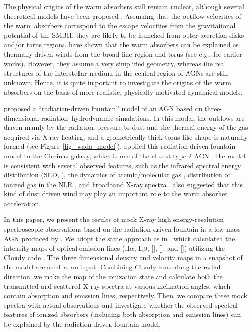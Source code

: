 \documentclass[twocolumn,times,twocolappendix]{aastex63}
\begin{document}
The physical origins of the warm absorbers still remain unclear, although
several theoretical models have been proposed \citep[e.g.,][]{Krolik1995,Proga2000,Fukumura2010}. Assuming
that the outflow velocities of the warm absorbers correspond to the escape
velocities from the gravitational potential of the SMBH, they are
likely to be launched from outer accretion disks and/or torus regions.
\citet{Mizumoto2019} have shown that the warm absorbers can be
explained as thermally-driven winds from
the broad line region and torus 
(see e.g., \citealt{Krolik1995} for earlier works). However, they assume a very
simplified geometry, whereas 
the real structures of the interstellar medium in the central 
region of AGNs are still unknown.
Hence, it is quite important to
investigate the origins of the warm absorbers on the basis of more
realistic, physically motivated dynamical models.

\cite{Wada2012} proposed a ``radiation-driven fountain'' model of an
AGN based on three-dimensional radiation–hydrodynamic simulations. In
this model, the outflows are driven mainly by the radiation pressure
to dust and the thermal energy of the gas acquired via X-ray heating,
and a geometrically thick torus-like shape is naturally formed (see
Figure~\ref{fig_wada_model}). \citet{Wada2016} applied this
radiation-driven fountain model to the Circinus galaxy, which is one
of the closest \citep[4.2~Mpc:][]{Freeman1977} type-2 AGN.  
The model is consistent with several observed features, such as the infrared spectral energy
distribution (SED, \citealp{Wada2016}), the dynamics of
atomic/molecular gas \citep{Wada2018a,Izumi2018,Uzuo2021},
distribution of ionized gas in the NLR \citep{Wada2018b}, and
broadband X-ray spectra \citep{Buchner2021}.
\citet{Mizumoto2019} also suggested that this kind of dust driven wind
may play an important role to the warm absorber acceleration.

In this paper, we present the results of mock X-ray high energy-resolution
spectroscopic observations based on the radiation-driven fountain in a low
mass AGN produced by \citet{Wada2016}.
We adopt the same approach as
in \citet{Wada2018b}, which calculated the intensity maps of optical
emission lines (H$\alpha$, H$\beta$, [], [], and [])
utilizing the \textsf{Cloudy} code \citep{Ferland2017}. 
The three dimensional density and velocity maps in a snapshot of the
\citet{Wada2016} model are used as an input. 
Combining \textsf{Cloudy}
runs along the radial direction, we make the map of the ionization
state and calculate both the transmitted and
scattered X-ray spectra at
various inclination angles, which contain absorption and emission
lines, respectively.
Then, we compare these mock spectra with actual observations and 
investigate whether the observed spectral features of ionized absorbers
(including both absorption and emission lines)
can be explained by the radiation-driven
fountain model. 
\end{document}
